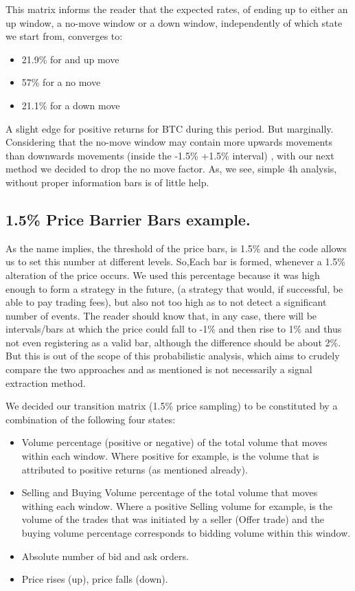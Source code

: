 This matrix informs the reader that the expected rates, of ending up to either an up window, a no-move window or a down window, independently of which state we start from, converges to:

\begin{itemize}
\item 21.9\% for and up move
\item 57\% for a no move 
\item 21.1\% for a down move
\end{itemize}

A slight edge for positive returns for BTC during this period. But marginally. Considering that the no-move window may contain more upwards movements than downwards movements (inside the -1.5\% +1.5\% interval) , with our next method we decided to drop the no move factor. As, we see, simple 4h analysis, without proper information bars is of little help.


\subsection{1.5\% Price Barrier Bars example.}

As the name implies, the threshold of the price bars, is 1.5\% and the code allows us to set this number at different levels. So,Each bar is formed, whenever a 1.5\% alteration of the price occurs. We used this percentage because it was high enough to form a strategy in the future, (a strategy that would, if successful, be able to pay trading fees), but also not too high as to not detect a significant number of events. The reader should know that, in any case, there will be intervals/bars at which the price could fall to -1\% and then rise to 1\% and thus not even registering as a valid bar, although the difference should be about 2\%. But this is out of the scope of this probabilistic analysis, which aims to crudely compare the two approaches and as mentioned is not necessarily a signal extraction method. 

We decided our transition matrix (1.5\% price sampling) to be constituted by a combination of the following four states:

\begin{itemize}
\item Volume percentage (positive or negative) of the total volume that moves within each window. Where positive for example, is the volume that is attributed to positive returns (as mentioned already).
\item Selling and Buying Volume percentage of the total volume that moves withing each window. Where a positive Selling volume for example, is the volume of the trades that was initiated by a seller (Offer trade) and the buying volume percentage corresponds to bidding volume within this window.
\item Absolute number of bid and ask orders.
\item Price rises (up), price falls (down).
\end{itemize}


